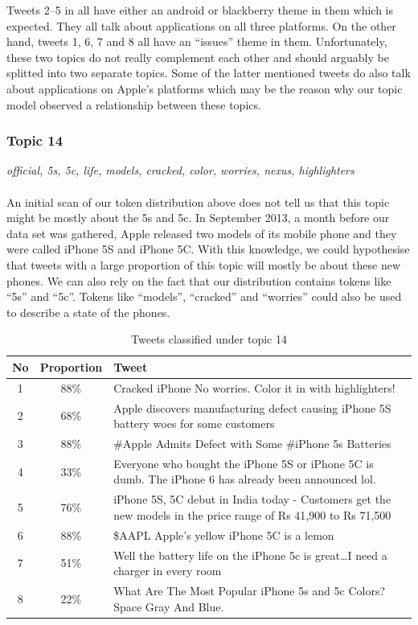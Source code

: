 Tweets 2--5 in  all have either an android or blackberry theme in them
which is expected. They all talk about applications on all three platforms. On the other hand,
tweets 1, 6, 7 and 8 all have an ``issues'' theme in them. Unfortunately, these two topics do not
really complement each other and should arguably be splitted into two separate topics. Some of the
latter mentioned tweets do also talk about applications on Apple's platforms which may be the reason
why our topic model observed a relationship between these topics.



\subsubsection{Topic 14}
\label{sec:topic-14}
\textit{official, 5s, 5c, life, models, cracked, color, worries, nexus, highlighters}\\\\
An initial scan of our token distribution above does not tell us that this topic might be mostly
about the 5s and 5c. In September 2013, a month before our data set was gathered, Apple released two
models of its mobile phone and they were called iPhone 5S and iPhone 5C. With this knowledge, we
could hypothesise that tweets with a large proportion of this topic will mostly be about these new
phones. We can also rely on the fact that our distribution contains tokens like ``5s'' and ``5c''.
Tokens like ``models'', ``cracked'' and ``worries'' could also be used to describe a state of the
phones.

\begin{table}[H]
  \begin{tabular}{c c p{13cm}} \toprule
    No & Proportion & Tweet \\ \midrule
    1  & 88\%       & Cracked iPhone No worries. Color it in with highlighters! \\ \midrule
    2  & 68\%       & Apple discovers manufacturing defect causing iPhone 5S battery woes for some customers \\ \midrule
    3  & 88\%       & \#Apple Admits Defect with Some \#iPhone 5s Batteries \\ \midrule
    4  & 33\%       & Everyone who bought the iPhone 5S or iPhone 5C is dumb. The iPhone 6 has already been announced lol. \\ \midrule
    5  & 76\%       & iPhone 5S, 5C debut in India today - Customers get the new models in the price range of Rs 41,900 to Rs 71,500 \\ \midrule
    6  & 88\%       & \$AAPL Apple's yellow iPhone 5C is a lemon \\ \midrule
    7  & 51\%       & Well the battery life on the iPhone 5c is great\ldots I need a charger in every room \\ \midrule
    8  & 22\%       & What Are The Most Popular iPhone 5s and 5c Colors? Space Gray And Blue. \\ \bottomrule
  \end{tabular}
  \caption{Tweets classified under topic 14}
  \label{tab:topic-14-tweets}
\end{table}

